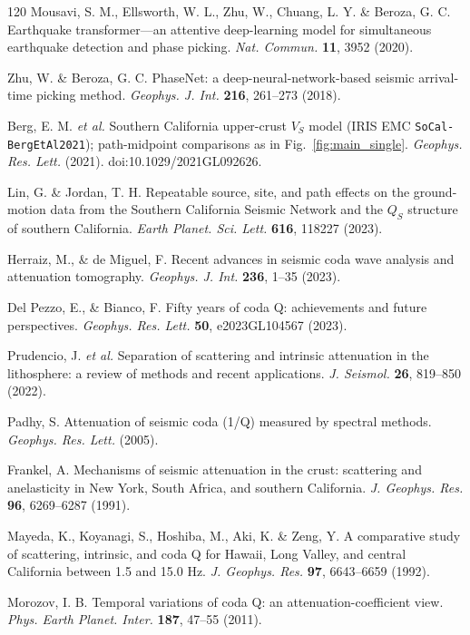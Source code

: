 \documentclass[twocolumn, 10pt]{article}
\begin{document}
\begin{thebibliography}{120}
 Mousavi, S. M., Ellsworth, W. L., Zhu, W., Chuang, L. Y. \& Beroza, G. C. Earthquake transformer---an attentive deep-learning model for simultaneous earthquake detection and phase picking. \emph{Nat. Commun.} \textbf{11}, 3952 (2020).

 Zhu, W. \& Beroza, G. C. PhaseNet: a deep-neural-network-based seismic arrival-time picking method. \emph{Geophys. J. Int.} \textbf{216}, 261--273 (2018).

 Berg, E. M. \emph{et al.} Southern California upper-crust \(V_S\) model (IRIS EMC \texttt{SoCal-BergEtAl2021}); path-midpoint comparisons as in Fig.~\ref{fig:main_single}. \emph{Geophys. Res. Lett.} (2021). doi:10.1029/2021GL092626.

 Lin, G. \& Jordan, T. H. Repeatable source, site, and path effects on the ground-motion data from the Southern California Seismic Network and the \(Q_S\) structure of southern California. \emph{Earth Planet. Sci. Lett.} \textbf{616}, 118227 (2023).

 Herraiz, M., \& de Miguel, F. Recent advances in seismic coda wave analysis and attenuation tomography. \emph{Geophys. J. Int.} \textbf{236}, 1--35 (2023).

 Del Pezzo, E., \& Bianco, F. Fifty years of coda Q: achievements and future perspectives. \emph{Geophys. Res. Lett.} \textbf{50}, e2023GL104567 (2023).

 Prudencio, J. \emph{et al.} Separation of scattering and intrinsic attenuation in the lithosphere: a review of methods and recent applications. \emph{J. Seismol.} \textbf{26}, 819--850 (2022).

 Padhy, S. Attenuation of seismic coda (1/Q) measured by spectral methods. \emph{Geophys. Res. Lett.} (2005).

 Frankel, A. Mechanisms of seismic attenuation in the crust: scattering and anelasticity in New York, South Africa, and southern California. \emph{J. Geophys. Res.} \textbf{96}, 6269--6287 (1991).

 Mayeda, K., Koyanagi, S., Hoshiba, M., Aki, K. \& Zeng, Y. A comparative study of scattering, intrinsic, and coda Q for Hawaii, Long Valley, and central California between 1.5 and 15.0 Hz. \emph{J. Geophys. Res.} \textbf{97}, 6643--6659 (1992).

 Morozov, I. B. Temporal variations of coda Q: an attenuation-coefficient view. \emph{Phys. Earth Planet. Inter.} \textbf{187}, 47--55 (2011).


\end{thebibliography}
\end{document}

